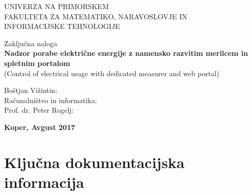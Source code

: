 \documentclass[12pt,a4paper,titlepage,openany]{report}
\begin{document}
\pagestyle{empty}
\begin{center}
\noindent \large UNIVERZA NA PRIMORSKEM\\
\large FAKULTETA ZA MATEMATIKO, NARAVOSLOVJE IN\\
INFORMACIJSKE TEHNOLOGIJE


\normalsize
\vspace{6cm}
Zaključna naloga\\
\textbf{\large Nadzor porabe električne energije z namensko razvitim merilcem in  spletnim portalom}\\
\normalsize
(Control of electrical usage with dedicated measurer and  web portal)\\
\end{center}

\begin{flushleft}
\vspace{5cm}
\noindent Boštjan Vižintin:
\\
\noindent Računalništvo in informatika:
\\
\noindent Prof. dr.  Peter Rogelj:
\\
\end{flushleft}

\vspace{4cm}
\begin{center}
\large \textbf{Koper, Avgust 2017}
\end{center}
\newpage

\pagestyle{fancy}

\section*{Ključna dokumentacijska informacija}
\end{document}
